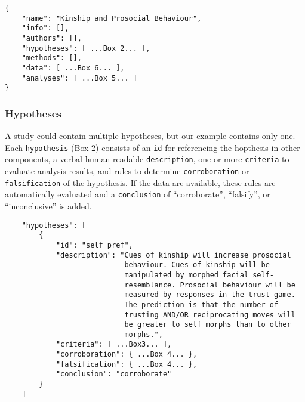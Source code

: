\documentclass[english,doc,floatsintext]{apa6}
\begin{document}
\begin{tcolorbox}[colback=black!5!white,colframe=white!5!black,title=Box 1. The top-level structure of the machine-readable study description.]
\begin{verbatim}
{
    "name": "Kinship and Prosocial Behaviour",
    "info": [],
    "authors": [],
    "hypotheses": [ ...Box 2... ],
    "methods": [],
    "data": [ ...Box 6... ],
    "analyses": [ ...Box 5... ]
}
\end{verbatim}
\end{tcolorbox}

\hypertarget{hypotheses}{%
\subsubsection{Hypotheses}\label{hypotheses}}

A study could contain multiple hypotheses, but our example contains only one. Each \texttt{hypothesis} (Box 2) consists of an \texttt{id} for referencing the hopthesis in other components, a verbal human-readable \texttt{description}, one or more \texttt{criteria} to evaluate analysis results, and rules to determine \texttt{corroboration} or \texttt{falsification} of the hypothesis. If the data are available, these rules are automatically evaluated and a \texttt{conclusion} of \enquote{corroborate}, \enquote{falsify}, or \enquote{inconclusive} is added.

\begin{tcolorbox}[colback=black!5!white,colframe=white!5!black,title=Box 2. The hypothesis component.]
\begin{verbatim}
    "hypotheses": [
        {
            "id": "self_pref",
            "description": "Cues of kinship will increase prosocial
                            behaviour. Cues of kinship will be
                            manipulated by morphed facial self-
                            resemblance. Prosocial behaviour will be
                            measured by responses in the trust game.
                            The prediction is that the number of
                            trusting AND/OR reciprocating moves will 
                            be greater to self morphs than to other
                            morphs.",
            "criteria": [ ...Box3... ],
            "corroboration": { ...Box 4... },
            "falsification": { ...Box 4... },
            "conclusion": "corroborate"
        }
    ]
\end{verbatim}
\end{tcolorbox}
\end{document}
